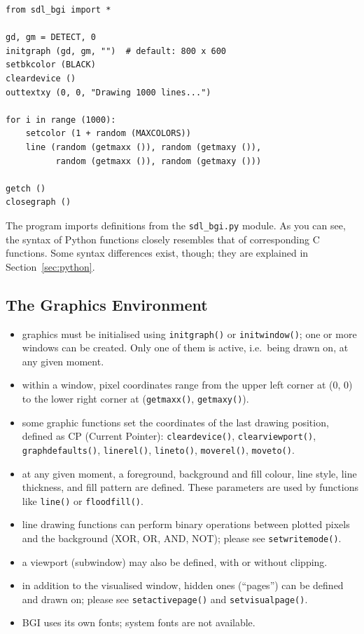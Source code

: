 \documentclass[a4paper,12pt]{article}
\newcommand{\ntt}[1]{\texttt{#1}}
\newcommand{\fn}[1]{\ntt{#1}}        %
\newcommand{\F}[1]{\ntt{#1}}         %
\begin{document}
\begin{lstlisting}
from sdl_bgi import *

gd, gm = DETECT, 0
initgraph (gd, gm, "")  # default: 800 x 600
setbkcolor (BLACK)
cleardevice ()
outtextxy (0, 0, "Drawing 1000 lines...")

for i in range (1000):
    setcolor (1 + random (MAXCOLORS))
    line (random (getmaxx ()), random (getmaxy ()),
          random (getmaxx ()), random (getmaxy ()))

getch ()
closegraph ()
\end{lstlisting}

The program imports definitions from the \F{sdl\_bgi.py} module. As
you can see, the syntax of Python functions closely resembles that of
corresponding C functions. Some syntax differences exist, though; they
are explained in Section~\ref{sec:python}.


\subsection{The Graphics Environment}

\begin{itemize}

\item graphics must be initialised using \fn{initgraph()} or
\fn{initwindow()}; one or more windows can be created. Only one of
them is active, i.e.\ being drawn on, at any given moment.

\item within a window, pixel coordinates range from the upper left
corner at (0, 0) to the lower right corner at (\fn{get\-maxx()},
\fn{getmaxy()}).

\item some graphic functions set the coordinates of the last drawing
position, defined as CP (Current Pointer): \fn{cleardevice()},
\fn{clearviewport()}, \fn{graphdefaults()}, \fn{linerel()},
\fn{lineto()}, \fn{moverel()}, \fn{moveto()}.

\item at any given moment, a foreground, background and fill colour,
line style, line thickness, and fill pattern are defined. These
parameters are used by functions like \fn{line()} or \fn{floodfill()}.

\item line drawing functions can perform binary operations between
plotted pixels and the background (XOR, OR, AND, NOT); please see
\fn{setwritemode()}.

\item a viewport (subwindow) may also be defined, with or without
clipping.

\item in addition to the visualised window, hidden ones (``pages'')
can be defined and drawn on; please see \fn{setactivepage()} and
\fn{setvisualpage()}.

\item BGI uses its own fonts; system fonts are not available.

\end{itemize}
\end{document}
